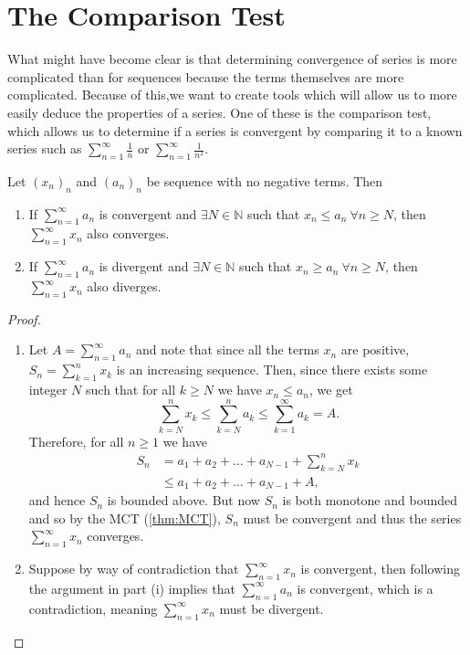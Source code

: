 \documentclass[../real_analysis.tex]{subfiles}
\begin{document}
    \section{The Comparison Test}\label{sec:comparison-test}
        What might have become clear is that determining convergence of series is more complicated than for sequences because the terms themselves are more complicated. Because of this,we want to create tools which will allow us to more easily deduce the properties of a series. One of these is the comparison test, which allows us to determine if a series is convergent by comparing it to a known series such as $\sum_{n=1}^\infty\frac{1}{n}$ or $\sum_{n=1}^\infty\frac{1}{n^2}$.
        \begin{theorem}\label{thm:comparison-test}
            Let $(x_n)_n$ and $(a_n)_n$ be sequence with no negative terms. Then
            \begin{enumerate}[label={\upshape(\roman*)}]
                \item If $\sum_{n=1}^\infty a_n$ is convergent and $\exists N\in\mathbb{N}$ such that $x_n\leq a_n\ \forall n\geq N$, then $\sum_{n=1}^\infty x_n$ also converges.
                \item If $\sum_{n=1}^\infty a_n$ is divergent and $\exists N\in\mathbb{N}$ such that $x_n\geq a_n\ \forall n\geq N$, then $\sum_{n=1}^\infty x_n$ also diverges.
            \end{enumerate}
        \end{theorem}
        \begin{proof}\\
            \begin{enumerate}[label={\upshape(\roman*)}]
                \item Let $A=\sum_{n=1}^\infty a_n$ and note that since all the terms $x_n$ are positive, $S_n=\sum_{k=1}^n x_k$ is an increasing sequence. Then, since there exists some integer $N$ such that for all $k\geq N$ we have $x_n\leq a_n$, we get
                \begin{equation}
                    \sum_{k=N}^n x_k\leq\sum_{k=N}^n a_k\leq\sum_{k=1}^\infty a_k=A.
                \end{equation}
                Therefore, for all $n\geq1$ we have
                \begin{align}
                    S_n&=a_1+a_2+\dots+a_{N-1}+\sum_{k=N}^n x_k\\
                    &\leq a_1+a_2+\dots+a_{N-1}+A,
                \end{align}
                and hence $S_n$ is bounded above. But now $S_n$ is both monotone and bounded and so by the MCT (\ref{thm:MCT}), $S_n$ must be convergent and thus the series $\sum_{n=1}^\infty x_n$ converges.
                \item Suppose by way of contradiction that $\sum_{n=1}^\infty x_n$ is convergent, then following the argument in part (i) implies that $\sum_{n=1}^\infty a_n$ is convergent, which is a contradiction, meaning $\sum_{n=1}^\infty x_n$ must be divergent.
            \end{enumerate}
        \end{proof}
\end{document}

